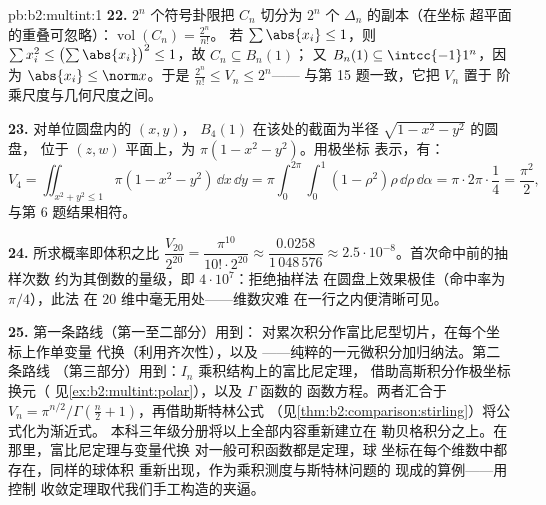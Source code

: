 \begin{solution}{pb:b2:multint:1}
\textbf{22.} $2^n$ 个符号卦限把 $C_n$ 切分为 $2^n$
个 $\Delta_n$ 的副本（在坐标
超平面的重叠可忽略）：$\operatorname{vol}(C_n) = \frac{2^n}{n!}$。
若 $\sum\abs{x_i} \leq 1$，则 $\sum x_i^2 \leq
\bigl(\sum\abs{x_i}\bigr)^2 \leq 1$，故 $C_n \subseteq B_n(1)$；
又 $B_n(1) \subseteq \intcc{-1}1^n$，因为 $\abs{x_i} \leq
\norm x$。于是 $\frac{2^n}{n!} \leq V_n \leq 2^n$——
与第 15 题一致，它把 $V_n$ 置于
阶乘尺度与几何尺度之间。

\textbf{23.} 对单位圆盘内的 $(x, y)$，
$B_4(1)$ 在该处的截面为半径 $\sqrt{1 - x^2 - y^2}$ 的圆盘，
位于 $(z, w)$ 平面上，为 $\pi(1 - x^2 - y^2)$。用极坐标
表示，有：
\[
V_4 = \iint_{x^2+y^2\leq1}\pi(1 - x^2 - y^2)\,\dd x\,\dd y
= \pi\int_0^{2\pi}\!\!\int_0^1(1 - \rho^2)\rho\,
\dd\rho\,\dd\alpha
= \pi\cdot2\pi\cdot\frac14 = \frac{\pi^2}2 ,
\]
与第 6 题结果相符。

\textbf{24.} 所求概率即体积之比
$\dfrac{V_{20}}{2^{20}} = \dfrac{\pi^{10}}{10!\cdot2^{20}}
\approx \dfrac{0.0258}{1\,048\,576} \approx
2.5\cdot10^{-8}$。首次命中前的抽样次数
约为其倒数的量级，即 $4\cdot10^7$：拒绝抽样法
在圆盘上效果极佳（命中率为 $\pi/4$），此法
在 $20$ 维中毫无用处——维数灾难
在一行之内便清晰可见。

\textbf{25.} 第一条路线（第一至二部分）用到：
对累次积分作富比尼型切片，在每个坐标上作单变量
代换（利用齐次性），以及
——纯粹的一元微积分加归纳法。第二条路线
（第三部分）用到：$I_n$ 乘积结构上的富比尼定理，
借助高斯积分作极坐标换元（
见\cref{ex:b2:multint:polar}），以及 $\Gamma$ 函数的
函数方程。两者汇合于 $V_n =
\pi^{n/2}/\Gamma(\frac n2 + 1)$，再借助斯特林公式
（见\cref{thm:b2:comparison:stirling}）将公式化为渐近式。
本科三年级分册将以上全部内容重新建立在
勒贝格积分之上。在那里，富比尼定理与变量代换
对一般可积函数都是定理，球
坐标在每个维数中都存在，同样的球体积
重新出现，作为乘积测度与斯特林问题的
现成的算例——用控制
收敛定理取代我们手工构造的夹逼。
\end{solution}

